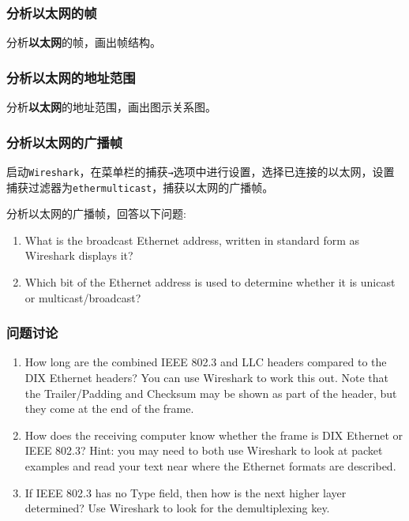 \documentclass{article}
\begin{document}
	\subsubsection{分析以太网的帧}
	
	分析\textbf{以太网}的帧，画出帧结构。
	
	\subsubsection{分析以太网的地址范围}
	
	分析\textbf{以太网}的地址范围，画出图示关系图。
	
	\subsubsection{分析以太网的广播帧}
	
	启动\texttt{Wireshark}，在菜单栏的捕获\texttt{→}选项中进行设置，选择已连接的以太网，设置捕获过滤器为\texttt{ethermulticast}，捕获以太网的广播帧。
	
	分析以太网的广播帧，回答以下问题:
	
	\begin{enumerate}[noitemsep, label={{\arabic*})}]
		\item What is the broadcast Ethernet address, written in standard form as Wireshark displays it?
		\item Which bit of the Ethernet address is used to determine whether it is unicast or multicast/broadcast?
	\end{enumerate}
	
	\subsubsection{问题讨论}
	
	\begin{enumerate}[noitemsep, label={{\arabic*})}]
		\item How long are the combined IEEE 802.3 and LLC headers compared to the DIX Ethernet headers? You can use Wireshark to work this out. Note that the Trailer/Padding and Checksum may be shown as part of the header, but they come at the end of the frame.
		\item How does the receiving computer know whether the frame is DIX Ethernet or IEEE 802.3? Hint: you may need to both use Wireshark to look at packet examples and read your text near where the Ethernet formats are described.
		\item If IEEE 802.3 has no Type field, then how is the next higher layer determined? Use Wireshark to look for the demultiplexing key.
	\end{enumerate}
	
\end{document}
